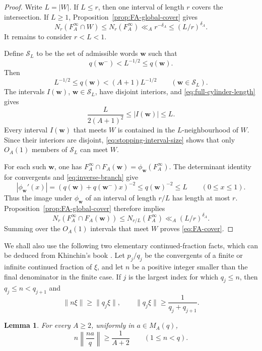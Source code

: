 \documentclass[11pt]{amsart}
\newtheorem{lemma}[theorem]{Lemma}
\begin{document}
\begin{proof}
Write $L=|W|$.  If $L\le r$, then one interval of length $r$ covers the intersection.  If
$L\ge1$, Proposition~\ref{prop:FA-global-cover} gives
$$
 N_r(F_A^\infty\cap W)\le N_r(F_A^\infty)
 \ll_A r^{-\delta_A}
 \le (L/r)^{\delta_A}.
$$
It remains to consider $r<L<1$.

Define $\mathcal S_L$ to be the set of admissible words $\mathbf w$ such that
$$
 q(\mathbf w^- )<L^{-1/2}\le q(\mathbf w).
$$
Then
$$
 L^{-1/2}\le q(\mathbf{w})<(A+1)L^{-1/2}
 \qquad(\mathbf{w}\in\mathcal S_L).
$$
The intervals $I(\mathbf{w})$, $\mathbf{w}\in\mathcal S_L$, have disjoint interiors, and
\eqref{eq:full-cylinder-length} gives
\begin{equation}\label{eq:stopping-interval-size}
 \frac{L}{2(A+1)^2}\le |I(\mathbf{w})|\le L.
\end{equation}
Every interval $I(\mathbf{w})$ that meets $W$ is contained in the $L$-neighbourhood of
$W$.  Since their interiors are disjoint, \eqref{eq:stopping-interval-size}
shows that only $O_A(1)$ members of $\mathcal S_L$ can meet $W$.

For each such $\mathbf{w}$, one has
$F_A^\infty\cap F_A(\mathbf{w})=\phi_{\mathbf{w}}(F_A^\infty)$.  The determinant identity for convergents
and \eqref{eq:inverse-branch} give
$$
 |\phi_{\mathbf{w}}'(x)|=(q(\mathbf{w})+q(\mathbf{w}^{-})x)^{-2}\le q(\mathbf{w})^{-2}\le L
 \qquad(0\le x\le1).
$$
Thus the image under $\phi_{\mathbf{w}}$ of an interval of length $r/L$ has length at
most $r$.  Proposition~\ref{prop:FA-global-cover} therefore implies
$$
 N_r(F_A^\infty\cap F_A(\mathbf{w}))
 \le N_{r/L}(F_A^\infty)
 \ll_A (L/r)^{\delta_A}.
$$
Summing over the $O_A(1)$ intervals that meet $W$ proves
\eqref{eq:FA-cover}.
\end{proof}

We shall also use the following two elementary continued-fraction facts, which
can be deduced from Khinchin's book \cite{KhinchinCF}.  Let $p_j/q_j$ be the
convergents of a finite or infinite continued fraction of $\xi$, and let $n$ be
a positive integer smaller than the final denominator in the finite case.  If
$j$ is the largest index for which $q_j\le n$, then $q_j\le n<q_{j+1}$ and
\begin{equation}\label{eq:best-approx-facts}
 \|n\xi\|\ge\|q_j\xi\|,
 \qquad
 \|q_j\xi\|\ge\frac1{q_j+q_{j+1}}.
\end{equation}


\begin{lemma}\label{lem:finite-badness}
For every $A\ge2$, uniformly in $a\in M_A(q)$,
\begin{equation}\label{eq:finitebad}
 n\left\|\frac{na}{q}\right\|\ge\frac1{A+2}
 \qquad(1\le n<q).
\end{equation}
\end{lemma}
\end{document}
